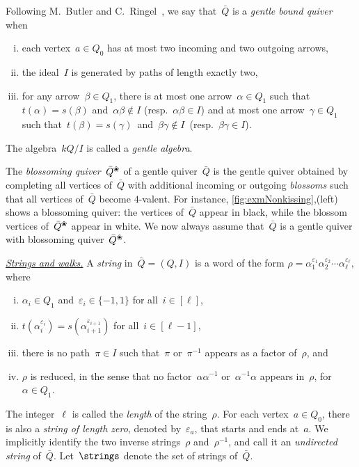 \documentclass{amsart}
\theoremstyle{definition}
\newcommand{\darkblue}{\color{darkblue}} %
\newcommand{\defn}[1]{\textsl{\darkblue #1}} %
\newcommand{\para}[1]{\medskip\noindent\uline{\textit{#1.}}} %
\newcommand{\quiver}{\bar Q} %
\newcommand{\blossom}{^\text{\ding{96}}} %
\begin{document}
Following M.~Butler and C.~Ringel~\cite{ButlerRingel}, we say that~$\quiver$ is a \defn{gentle bound quiver} when
\begin{enumerate}[(i)]
\item each vertex~$a \in Q_0$ has at most two incoming and two outgoing arrows,
\item the ideal~$I$ is generated by paths of length exactly two,
\item for any arrow~$\beta \in Q_1$, there is at most one arrow~$\alpha \in Q_1$ such that~$t(\alpha) = s(\beta)$ and~${\alpha\beta\notin I}$ (resp.~$\alpha\beta \in I$) and at most one arrow~$\gamma \in Q_1$ such that~$t(\beta) = s(\gamma)$~and~${\beta\gamma\notin I}$~(resp.~${\beta\gamma \in I}$).
\end{enumerate}
The algebra~$kQ/I$ is called a \defn{gentle algebra}.

The \defn{blossoming quiver}~$\quiver\blossom$ of a gentle quiver~$\quiver$ is the gentle quiver obtained by completing all vertices of~$\quiver$ with additional incoming or outgoing \defn{blossoms} such that all vertices of~$\quiver$ become $4$-valent.
For instance, \cref{fig:exmNonkissing},(left) shows a blossoming quiver: the vertices of~$\quiver$ appear in black, while the blossom vertices of~$\quiver\blossom$ appear in white.
We now always assume that~$\quiver$ is a gentle quiver with blossoming quiver~$\quiver\blossom$.

\para{Strings and walks}
%
A \defn{string} in~$\quiver = (Q,I)$ is a word of the form
\(
\rho = \alpha_1^{\varepsilon_1}\alpha_2^{\varepsilon_2}\cdots \alpha_\ell^{\varepsilon_\ell},
\)
where
	\begin{enumerate}[(i)]
	\item $\alpha_i \in Q_1$ and~$\varepsilon_i \in \{-1,1\}$ for all~$i \in [\ell]$,
	\item $t(\alpha_i^{\varepsilon_i}) = s(\alpha_{i+1}^{\varepsilon_{i+1}})$ for all~$i \in [\ell-1]$,
	\item there is no path~$\pi \in I$ such that~$\pi$ or~$\pi^{-1}$ appears as a factor of~$\rho$, and
	\item $\rho$ is reduced, in the sense that no factor~$\alpha\alpha^{-1}$ or~$\alpha^{-1}\alpha$ appears in~$\rho$, for~$\alpha \in Q_1$.
	\end{enumerate}
The integer~$\ell$ is called the \defn{length} of the string~$\rho$.
For each vertex~$a \in Q_0$, there is also a \defn{string of length zero}, denoted by~$\varepsilon_a$, that starts and ends at~$a$.
We implicitly identify the two inverse strings~$\rho$ and~$\rho^{-1}$, and call it an \defn{undirected string} of~$\quiver$.
Let~$\strings$ denote the set of strings of~$\quiver$.
\end{document}
